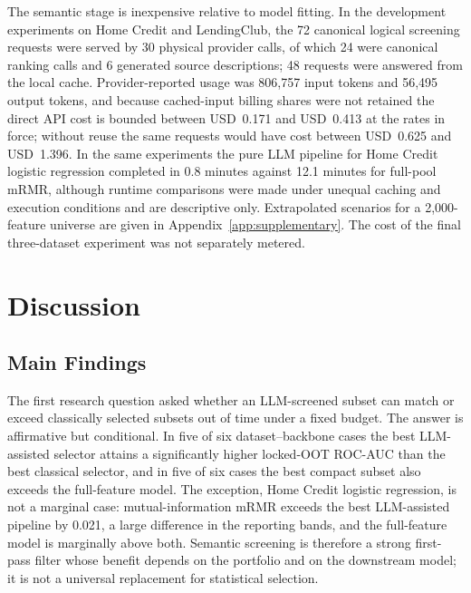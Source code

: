 \documentclass[preprint,12pt]{elsarticle}
\begin{document}
The semantic stage is inexpensive relative to model fitting. In the development experiments on Home Credit and LendingClub, the 72 canonical logical screening requests were served by 30 physical provider calls, of which 24 were canonical ranking calls and 6 generated source descriptions; 48 requests were answered from the local cache. Provider-reported usage was 806,757 input tokens and 56,495 output tokens, and because cached-input billing shares were not retained the direct API cost is bounded between USD~0.171 and USD~0.413 at the rates in force; without reuse the same requests would have cost between USD~0.625 and USD~1.396. In the same experiments the pure LLM pipeline for Home Credit logistic regression completed in 0.8 minutes against 12.1 minutes for full-pool mRMR, although runtime comparisons were made under unequal caching and execution conditions and are descriptive only. Extrapolated scenarios for a 2,000-feature universe are given in Appendix~\ref{app:supplementary}. The cost of the final three-dataset experiment was not separately metered.


\section{Discussion}
\label{sec:discussion}

\subsection{Main Findings}
\label{subsec:main_findings}

The first research question asked whether an LLM-screened subset can match or exceed classically selected subsets out of time under a fixed budget. The answer is affirmative but conditional. In five of six dataset--backbone cases the best LLM-assisted selector attains a significantly higher locked-OOT ROC-AUC than the best classical selector, and in five of six cases the best compact subset also exceeds the full-feature model. The exception, Home Credit logistic regression, is not a marginal case: mutual-information mRMR exceeds the best LLM-assisted pipeline by 0.021, a large difference in the reporting bands, and the full-feature model is marginally above both. Semantic screening is therefore a strong first-pass filter whose benefit depends on the portfolio and on the downstream model; it is not a universal replacement for statistical selection.
\end{document}
